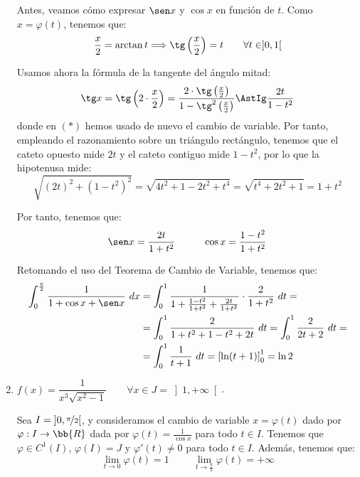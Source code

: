 \begin{ejercicio}
\begin{enumerate}
        Antes, veamos cómo expresar $\sen x$ y $\cos x$ en función de $t$.
        Como $x=\varphi (t)$, tenemos que:
        \begin{equation*}
            \frac{x}{2} = \arctan t \Longrightarrow
            \tg\left(\frac{x}{2}\right) = t \qquad \forall t\in ]0,1[
        \end{equation*}

        Usamos ahora la fórmula de la tangente del ángulo mitad:
        \begin{equation*}
            \tg x = \tg\left(2\cdot \frac{x}{2}\right)
            = \frac{2\cdot \tg\left(\frac{x}{2}\right)}{1-\tg^2\left(\frac{x}{2}\right)}
            \AstIg \frac{2t}{1-t^2}
        \end{equation*}
        donde en $(\ast)$ hemos usado de nuevo el cambio de variable. Por tanto, empleando el razonamiento
        sobre un triángulo rectángulo, tenemos que el cateto opuesto mide $2t$ y
        el cateto contiguo mide $1-t^2$, por lo que la hipotenusa mide:
        \begin{equation*}
            \sqrt{(2t)^2 + (1-t^2)^2} = \sqrt{4t^2 + 1 - 2t^2 + t^4}
            = \sqrt{t^4 + 2t^2 + 1} = 1 + t^2
        \end{equation*}

        Por tanto, tenemos que:
        \begin{equation*}
            \sen x = \frac{2t}{1+t^2} \hspace{1cm} \cos x = \frac{1-t^2}{1+t^2}
        \end{equation*}

        Retomando el uso del Teorema de Cambio de Variable, tenemos que:
        \begin{align*}
            \int_0^{\frac{\pi}{2}} \dfrac{1}{1+\cos x + \sen x}~dx
            &= \int_0^1 \dfrac{1}{1+\frac{1-t^2}{1+t^2} + \frac{2t}{1+t^2}}\cdot \frac{2}{1+t^2}~dt
            =\\&= \int_0^1 \dfrac{2}{1+t^2+1-t^2+2t}~dt
            = \int_0^1 \dfrac{2}{2t+2}~dt
            =\\&= \int_0^1 \dfrac{1}{t+1}~dt
            = \left[\ln(t+1)\right]_0^1
            = \ln 2
        \end{align*}

        \item $f(x)=\dfrac{1}{x^3\sqrt{x^2-1}} \qquad \forall x\in J=\left]1,+\infty\right[$.
        
        Sea $I=\left]0,\nicefrac{\pi}{2}\right[$, y consideramos 
        el cambio de variable $x=\varphi(t)$ dado por $\varphi:I\to \bb{R}$ dada por $\varphi(t)=\frac{1}{\cos x}$ para todo $t\in I$.
        Tenemos que $\varphi\in C^1(I)$, $\varphi(I)=J$ y $\varphi'(t)\neq 0$ para todo $t\in I$.
        Además, tenemos que:
        \begin{equation*}
            \lim_{t\to 0} \varphi(t) = 1 \hspace{1cm} \lim_{t\to \frac{\pi}{2}} \varphi(t) = +\infty
        \end{equation*}


\end{enumerate}
\end{ejercicio}
